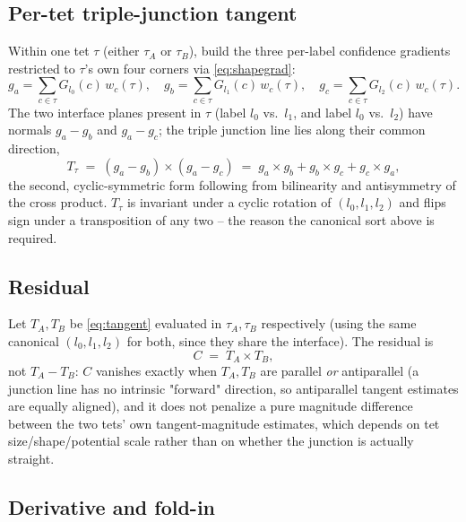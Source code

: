 \documentclass[11pt]{article}
\begin{document}
\subsection{Per-tet triple-junction tangent}

Within one tet $\tau$ (either $\tau_A$ or $\tau_B$), build the three
per-label confidence gradients restricted to $\tau$'s own four corners via
\eqref{eq:shapegrad}:
\begin{equation}
  g_a = \sum_{c\in\tau} G_{l_0}(c)\,w_c(\tau), \quad
  g_b = \sum_{c\in\tau} G_{l_1}(c)\,w_c(\tau), \quad
  g_c = \sum_{c\in\tau} G_{l_2}(c)\,w_c(\tau).
\end{equation}
The two interface planes present in $\tau$ (label $l_0$ vs.\ $l_1$, and
label $l_0$ vs.\ $l_2$) have normals $g_a - g_b$ and $g_a - g_c$; the
triple junction line lies along their common direction,
\begin{equation}
  T_\tau \;=\; (g_a - g_b)\times(g_a - g_c)
  \;=\; g_a\times g_b + g_b\times g_c + g_c\times g_a,
  \label{eq:tangent}
\end{equation}
the second, cyclic-symmetric form following from bilinearity and
antisymmetry of the cross product. $T_\tau$ is invariant under a cyclic
rotation of $(l_0,l_1,l_2)$ and flips sign under a transposition of any
two -- the reason the canonical sort above is required.

\subsection{Residual}

Let $T_A, T_B$ be \eqref{eq:tangent} evaluated in $\tau_A,\tau_B$
respectively (using the same canonical $(l_0,l_1,l_2)$ for both, since they
share the interface). The residual is
\begin{equation}
  C \;=\; T_A \times T_B,
  \label{eq:junctionresidual}
\end{equation}
not $T_A - T_B$: $C$ vanishes exactly when $T_A,T_B$ are parallel
\emph{or} antiparallel (a junction line has no intrinsic "forward"
direction, so antiparallel tangent estimates are equally aligned), and it
does not penalize a pure magnitude difference between the two tets' own
tangent-magnitude estimates, which depends on tet size/shape/potential
scale rather than on whether the junction is actually straight.

\subsection{Derivative and fold-in}
\end{document}
